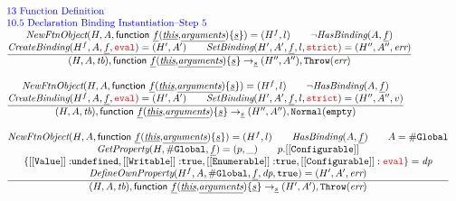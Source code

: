 \documentclass[a4paper, leqno]{amsart}
\newcommand{\rulesep}{\quad\quad}
\newcommand{\stmt}{s}
\newcommand{\ir}[1]{\ensuremath{\underline{#1}}}
\def\inred{\color{red}}
\def\inblue{\color{blue}}
\newcommand{\strict}{{\inred\tt strict}}
\newcommand{\eval}{{\inred\tt eval}}
\newcommand{\undef}{{\tt undefined}}
\newcommand{\true}{{\tt true}}
\newcommand{\tb}{\emph{tb}}
\newcommand{\err}{\emph{err}}
\renewcommand{\lg}{{\tt \#Global}}
\newcommand{\hf}[1]{\emph{#1}}
\newcommand{\void}{{\tt Normal}({\tt empty})}
\newcommand{\error}{\ensuremath{{\tt Throw}(\err)}}
\newcommand{\state}{\ensuremath{(H,A,\tb)}}
\newcommand{\resp}{\ensuremath{(H',A')}}
\newcommand{\respp}{\ensuremath{(H'',A'')}}
\newcommand{\irfndecl}{\ensuremath{{\sf function} \ \ir{f} {\tt(}\ir{\emph{this}}{\tt,}\ir{\emph{arguments}}{\tt) \{} \ir\stmt {\tt\}}}}
\def\inred{\color{red}}
\def\inblue{\color{blue}}
\begin{document}
\[
\begin{array}{l@{~~}l@{~~}ll}
\mbox{\inblue 13 Function Definition}\\
\mbox{\inblue 10.5 Declaration Binding Instantiation--Step 5}\\
\frac{\begin{matrix}
\hf{NewFtnObject}(H,A,\irfndecl) = (H^f, l)
\rulesep
\neg\hf{HasBinding}(A, \ir{f})
\\
\hf{CreateBinding}(H^f, A, \ir{f}, \eval) = \resp
\rulesep
\hf{SetBinding}(H', A', \ir{f}, l, \strict) = (H'', A'', \err)
\end{matrix}}{\begin{matrix}
\state, \irfndecl \rightarrow_{\ir\stmt}
\respp, \error
\end{matrix}}\\[2em]

\frac{\begin{matrix}
\hf{NewFtnObject}(H,A,\irfndecl) = (H^f, l)
\rulesep
\neg\hf{HasBinding}(A, \ir{f})
\\
\hf{CreateBinding}(H^f, A, \ir{f}, \eval) = \resp
\rulesep
\hf{SetBinding}(H', A', \ir{f}, l, \strict) = (H'', A'', v)
\end{matrix}}{\begin{matrix}
\state, \irfndecl \rightarrow_{\ir\stmt} \respp, \void
\end{matrix}}\\[2em]

\frac{\begin{matrix}
\hf{NewFtnObject}(H,A,\irfndecl) = (H^f, l)
\rulesep
\hf{HasBinding}(A, \ir{f})
\rulesep A = \lg\\
\hf{GetProperty}(H,\lg,\ir{f}) = (p, \_)
\rulesep
p.{\tt[[Configurable]]}
\\
\{{\tt [[Value]]:}\undef, {\tt [[Writable]]:}\true, {\tt [[Enumerable]]:}\true, {\tt [[Configurable]]:\eval}\} = \emph{dp}
\\
\hf{DefineOwnProperty}(H^f,A,\lg,\ir{f}, \emph{dp}, \true) = (H',A',\err)\\
\end{matrix}}{\begin{matrix}
\state, \irfndecl \rightarrow_{\ir\stmt} \resp,\error
\end{matrix}}\\[2em]


\end{array}\]
\end{document}
